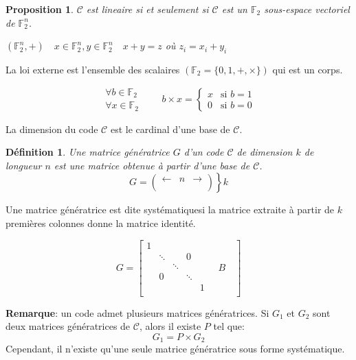 \documentclass[a4paper,10pt,twocolumn]{article}
\theoremstyle{break}
\newtheorem{mydef}{Définition}
\newtheorem{myprop}{Proposition}
\newenvironment{note}[1]
{\textbf{#1}:}
{}
\newenvironment{remarque}
{\begin{note}{Remarque}}
{\end{note}}
\begin{document}
\begin{myprop}
 $\mathcal{C}$ est lineaire si et seulement si $\mathcal{C}$ est un $\mathbb{F}_2$ sous-espace vectoriel de $\mathbb{F}_2^n$.
 \begin{center} 
 $ (\mathbb{F}_2^{n}, +) \quad x \in \mathbb{F}_2^n, y \in \mathbb{F}_2^n \quad x+y=z $ où $z_i = x_i + y_i $
 \end{center}
\end{myprop}

La loi externe est l'ensemble des scalaires $(\mathbb{F}_2 = \lbrace 0, 1, +, \times \rbrace)$ qui est un corps.

$$
\begin{array}{l}
 \forall b \in \mathbb{F}_2 \\
 \forall x \in \mathbb{F}_2 
\end{array} \qquad
b \times x = 
\begin{cases}
 x & \text{si $b = 1$} \\
 0 & \text{si $b = 0$}
\end{cases}
$$

La dimension du code $\mathcal{C}$ est le cardinal d'une base de $\mathcal{C}$.

\begin{mydef}
 Une matrice génératrice $G$ d'un code $\mathcal{C}$ de dimension $k$ de longueur $n$ est une matrice obtenue à partir d'une base de $\mathcal{C}$.
 $$ G = \left.\left(\begin{array}{ccc} \leftarrow & n & \rightarrow \\ & & \\ & & \end{array}\right)\right\rbrace k $$
\end{mydef}

Une matrice génératrice est dite \flqq systématique\frqq si la matrice extraite à partir de $k$ premières colonnes donne la matrice identité.

$$ G = \left\lbrack
\begin{array}{ccccc|}
 1 & & & & \\
 & \ddots & & 0 & \\
 & & \ddots & & \\
 & 0 & & \ddots & \\
 & & & & 1 \\
\end{array}
\quad B \quad 
\right\rbrack
$$

\begin{remarque}
 un code admet plusieurs matrices génératrices. Si $G_1$ et $G_2$ sont deux matrices génératrices de $\mathcal{C}$, alors il existe $P$ tel que:
$$ G_1 = P \times G_2 $$
Cependant, il n'existe qu'une seule matrice génératrice sous forme systématique.
\end{remarque}
\end{document}
